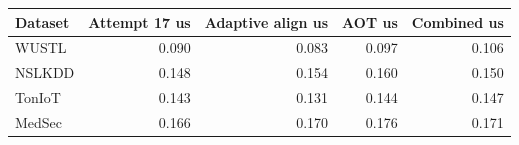 \begin{tabular}{lrrrr}
\toprule
Dataset & Attempt 17 us & Adaptive align us & AOT us & Combined us \\
\midrule
WUSTL & 0.090 & 0.083 & 0.097 & 0.106 \\
NSLKDD & 0.148 & 0.154 & 0.160 & 0.150 \\
TonIoT & 0.143 & 0.131 & 0.144 & 0.147 \\
MedSec & 0.166 & 0.170 & 0.176 & 0.171 \\
\bottomrule
\end{tabular}
